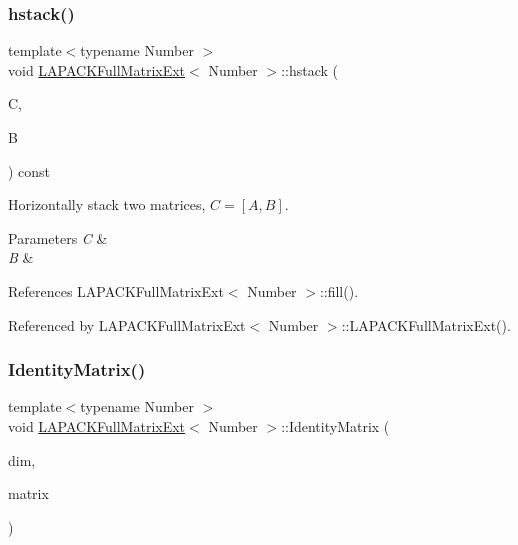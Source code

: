 \subsubsection{\texorpdfstring{hstack()}{hstack()}}
{\footnotesize\ttfamily template$<$typename Number $>$ \\
void \hyperlink{classLAPACKFullMatrixExt}{L\+A\+P\+A\+C\+K\+Full\+Matrix\+Ext}$<$ Number $>$\+::hstack (\begin{DoxyParamCaption}\item[{\hyperlink{classLAPACKFullMatrixExt}{L\+A\+P\+A\+C\+K\+Full\+Matrix\+Ext}$<$ Number $>$ \&}]{C,  }\item[{const \hyperlink{classLAPACKFullMatrixExt}{L\+A\+P\+A\+C\+K\+Full\+Matrix\+Ext}$<$ Number $>$ \&}]{B }\end{DoxyParamCaption}) const}

Horizontally stack two matrices, $C = [A, B]$. 
\begin{DoxyParams}{Parameters}
{\em C} & \\
\hline
{\em B} & \\
\hline
\end{DoxyParams}


References L\+A\+P\+A\+C\+K\+Full\+Matrix\+Ext$<$ Number $>$\+::fill().



Referenced by L\+A\+P\+A\+C\+K\+Full\+Matrix\+Ext$<$ Number $>$\+::\+L\+A\+P\+A\+C\+K\+Full\+Matrix\+Ext().

\mbox{\label{classLAPACKFullMatrixExt_a6599cc906b61cd77203daeeb06735daa}} 
\subsubsection{\texorpdfstring{Identity\+Matrix()}{IdentityMatrix()}}
{\footnotesize\ttfamily template$<$typename Number $>$ \\
void \hyperlink{classLAPACKFullMatrixExt}{L\+A\+P\+A\+C\+K\+Full\+Matrix\+Ext}$<$ Number $>$\+::Identity\+Matrix (\begin{DoxyParamCaption}\item[{const \hyperlink{classLAPACKFullMatrixExt_a5cf5f4a6104dc17029210b5ca52bf574}{size\+\_\+type}}]{dim,  }\item[{\hyperlink{classLAPACKFullMatrixExt}{L\+A\+P\+A\+C\+K\+Full\+Matrix\+Ext}$<$ Number $>$ \&}]{matrix }\end{DoxyParamCaption})\hspace{0.3cm}{\ttfamily [static]}}

